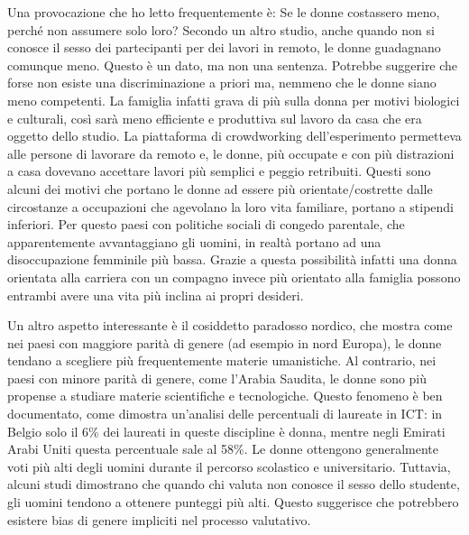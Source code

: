 \documentclass[12pt]{book} %
\begin{document}
Una provocazione che ho letto frequentemente è: Se le donne costassero meno, perché non assumere solo loro?
Secondo un altro studio, anche quando non si conosce il sesso dei partecipanti per dei lavori in remoto, le donne guadagnano comunque meno. Questo è un dato, ma non una sentenza. Potrebbe suggerire che forse non esiste una discriminazione a priori ma, nemmeno che le donne siano meno competenti. La famiglia infatti grava di più sulla donna per motivi biologici e culturali, così sarà meno efficiente e produttiva sul lavoro da casa che era oggetto dello studio. La piattaforma di crowdworking dell'esperimento permetteva alle persone di lavorare da remoto e, le donne, più occupate e con più distrazioni a casa dovevano accettare lavori più semplici e peggio retribuiti. Questi sono alcuni dei motivi che portano le donne ad essere più orientate/costrette dalle circostanze a occupazioni che agevolano la loro vita familiare, portano a stipendi inferiori. Per questo paesi con politiche sociali di congedo parentale, che apparentemente avvantaggiano gli uomini, in realtà portano ad una disoccupazione femminile più bassa. Grazie a questa possibilità infatti una donna orientata alla carriera con un compagno invece più orientato alla famiglia possono entrambi avere una vita più inclina ai propri desideri. 





Un altro aspetto interessante è il cosiddetto paradosso nordico, che mostra come nei paesi con maggiore parità di genere (ad esempio in nord Europa), le donne tendano a scegliere più frequentemente materie umanistiche. Al contrario, nei paesi con minore parità di genere, come l’Arabia Saudita, le donne sono più propense a studiare materie scientifiche e tecnologiche. Questo fenomeno è ben documentato, come dimostra un’analisi delle percentuali di laureate in ICT: in Belgio solo il 6\% dei laureati in queste discipline è donna, mentre negli Emirati Arabi Uniti questa percentuale sale al 58\%.
Le donne ottengono generalmente voti più alti degli uomini durante il percorso scolastico e universitario. Tuttavia, alcuni studi dimostrano che quando chi valuta non conosce il sesso dello studente, gli uomini tendono a ottenere punteggi più alti. Questo suggerisce che potrebbero esistere bias di genere impliciti nel processo valutativo.
\end{document}
